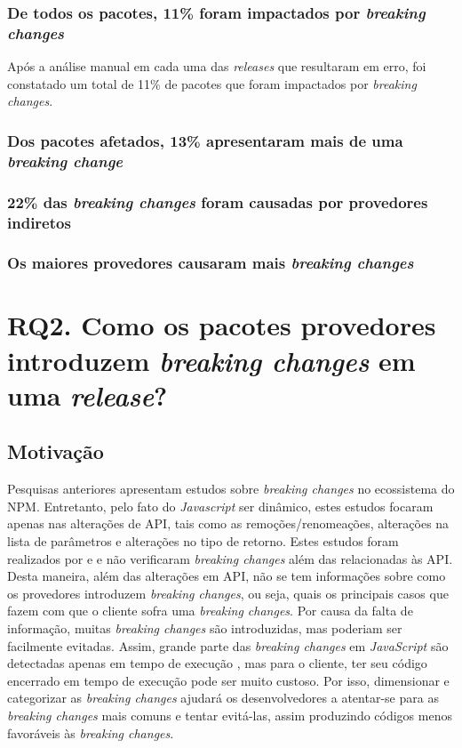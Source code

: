 \subsubsection{De todos os pacotes, 11\% foram impactados por \textit{breaking changes}}
Após a análise manual em cada uma das \textit{releases} que resultaram em erro, foi constatado um total de 11\% de pacotes que foram impactados por \textit{breaking changes}.

\subsubsection{Dos pacotes afetados, 13\% apresentaram mais de uma \textit{breaking change}}

\subsubsection{22\% das \textit{breaking changes} foram causadas por provedores indiretos}

\subsubsection{Os maiores provedores causaram mais \textit{breaking changes}}

\section{RQ2. Como os pacotes provedores introduzem \textit{breaking changes} em uma \textit{release}?}
\label{sec:rq2}

\subsection{Motivação}
\label{mot:rq2}
Pesquisas anteriores apresentam estudos sobre \textit{breaking changes} no ecossistema do \gls{NPM}. Entretanto, pelo fato do \textit{Javascript} ser dinâmico, estes estudos focaram apenas nas alterações de \gls{API}, tais como as remoções/renomeações, alterações na lista de parâmetros e alterações no tipo de retorno. Estes estudos foram realizados por   e  e não verificaram \textit{breaking changes} além das relacionadas às \gls{API}. Desta maneira, além das alterações em \gls{API}, não se tem informações sobre como os provedores introduzem \textit{breaking changes}, ou seja, quais os principais casos que fazem com que o cliente sofra uma \textit{breaking changes}. Por causa da falta de informação, muitas \textit{breaking changes} são introduzidas, mas poderiam ser facilmente evitadas. Assim, grande parte das \textit{breaking changes} em \textit{JavaScript} são detectadas apenas em tempo de execução \cite{noregrets2018}, mas para o cliente, ter seu código encerrado em tempo de execução pode ser muito custoso. Por isso, dimensionar e categorizar as \textit{breaking changes} ajudará os desenvolvedores a atentar-se para as \textit{breaking changes} mais comuns e tentar evitá-las, assim produzindo códigos menos favoráveis às \textit{breaking changes}.

